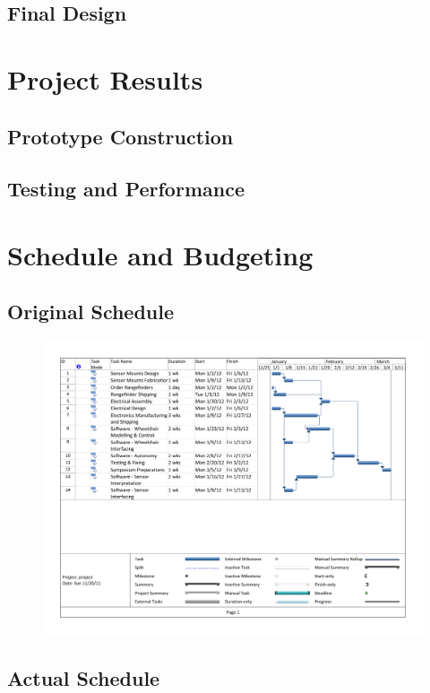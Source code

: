 \documentclass[oneside,final,a4paper]{report}
\begin{document}
\section{Final Design}


\chapter{Project Results}

\section{Prototype Construction}

\section{Testing and Performance}

\chapter{Schedule and Budgeting}

\section{Original Schedule}
\begin{figure}
 \centering
 \includegraphics[scale=0.6]{gantt} \label{fig:gantt}
\end{figure}

\section{Actual Schedule}
\end{document}
